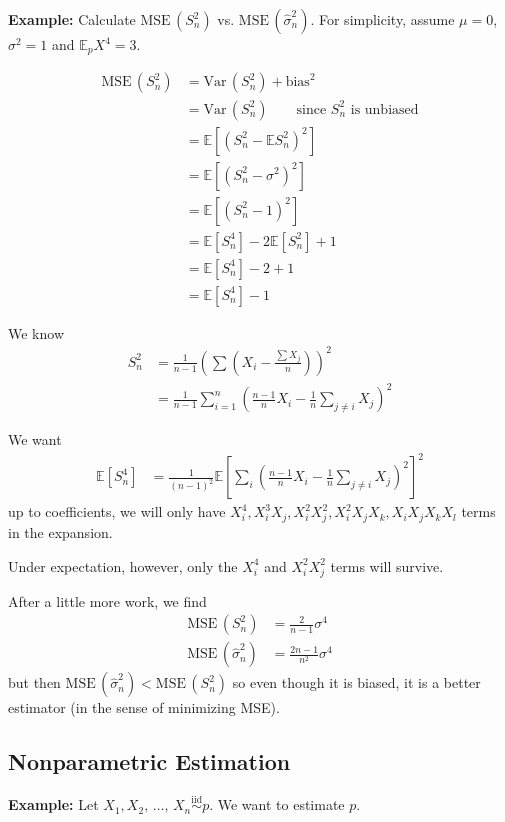 \documentclass[12pt]{report}
\renewcommand{\hat}[1]{\widehat{#1}}
\newcommand{\E}{\mathbb{E}}
\newcommand{\Var}{\text{Var}\,}
\newcommand{\iid}{\overset{\text{iid}}{\sim}}
\newcommand*{\tbf}[1]{\ifmmode\mathbf{#1}\else\textbf{#1}\fi}
\newcommand{\MSE}{\text{MSE}\,}
\begin{document}
\tbf{Example:} Calculate $\MSE(S_n^2)$ vs. $\MSE(\hat \sigma_n^2)$. For simplicity, assume $\mu = 0$,$\sigma^2 = 1$ and $\E_p X^4 = 3$.

\begin{align*}
    \MSE(S_n^2) & = \Var(S_n^2) + \text{bias}^2                         \\
                & = \Var(S_n^2) \qquad \text{since $S_n^2$ is unbiased} \\
                & = \E[(S_n^2 - \E S_n^2)^2]                            \\
                & = \E[(S_n^2 - \sigma^2)^2]                            \\
                & = \E[(S_n^2 - 1)^2]                                   \\
                & = \E[S_n^4] - 2\E[S_n^2] + 1                          \\
                & = \E[S_n^4] - 2 + 1                                   \\
                & = \E[S_n^4] - 1
\end{align*}

We know
\begin{align*}
    S_n^2 & = \frac{1}{n-1} \left(\sum (X_i - \frac{\sum X_j}{n})\right)^2                                 \\
          & = \frac{1}{n-1} \sum_{i=1}^n \left(\frac{n-1}{n} X_i - \frac{1}{n} \sum_{j\neq i} X_j\right)^2
\end{align*}

We want
\begin{align*}
    \E[S_n^4] & = \frac{1}{(n-1)^2} \E\left[\sum_i \left(\frac{n-1}{n} X_i - \frac{1}{n} \sum_{j\neq i} X_j\right)^2\right]^2
\end{align*}
up to coefficients, we will only have $X_i^4, X_i^3X_j, X_i^2X_j^2, X_i^2X_jX_k, X_iX_jX_kX_l$ terms in the expansion.

Under expectation, however, only the $X_i^4$ and $X_i^2 X_j^2$ terms will survive.

After a little more work, we find
\begin{align*}
    \MSE(S_n^2)           & = \frac{2}{n -1} \sigma^4  \\
    \MSE(\hat \sigma_n^2) & = \frac{2n-1}{n^2}\sigma^4
\end{align*}
but then $\MSE(\hat \sigma_n^2) < \MSE(S_n^2)$ so even though it is biased, it is a better estimator (in the sense of minimizing MSE).

\subsection{Nonparametric Estimation}
\tbf{Example:} Let $X_1, X_2, \, \dots,\, X_n \iid p$. We want to estimate $p$.
\end{document}
